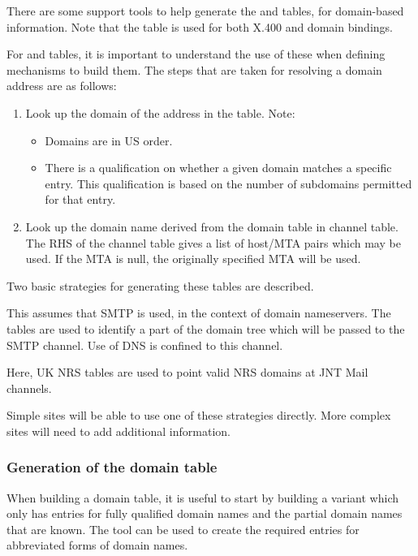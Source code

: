There are some support tools to help generate 
the  and
 tables, for domain-based information.
Note that the  table is used for both X.400 and domain bindings.

For  and  tables, it is important to understand the use
of these when defining mechanisms to build them.
The steps that
are taken for resolving a domain address are as follows:
\begin{enumerate}
\item	Look up the domain of the address in the  table.
Note:
\begin {itemize}
\item Domains are in US order.
\item There is a qualification on whether a given domain matches a
specific entry. This qualification is based on the number of
subdomains permitted for that entry.
\end {itemize}

\item	Look up the domain name derived from the domain table in
channel table. The RHS of 
the channel table gives a list of host/MTA pairs which may be used.
If the MTA is null, the originally specified MTA will be used.
\end{enumerate}


Two basic strategies for generating these tables are described.

\begin {describe}
\item[Internet:] This assumes that SMTP is used, in the context of domain
nameservers.  The tables are used to identify a part of the domain tree
which will be passed to the SMTP channel.  Use of DNS is confined to this
channel.

\item[NRS:] Here, UK NRS tables are used to point valid NRS domains at JNT
Mail channels.   
\end {describe}

Simple sites will be able to use one of these strategies directly.  More
complex sites will need to add additional information.

\subsubsection{Generation of the domain table}\label{tablebuild:domain}

When building a domain table, it is useful to start by building a variant
which only has entries for fully qualified domain names and the
partial domain names that are known.
The  tool can be used to create the required
entries for abbreviated forms of domain names.  

